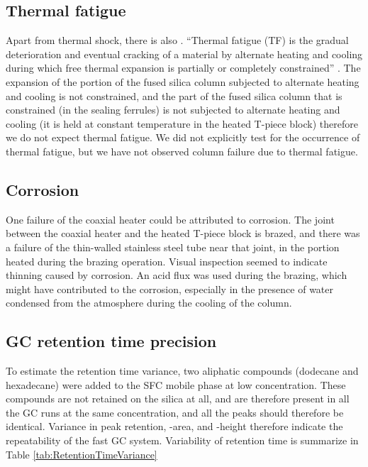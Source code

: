 \subsection{Thermal fatigue}
Apart from thermal shock, there is also . ``Thermal
fatigue (TF) is the gradual deterioration and eventual cracking of a material by
alternate heating and cooling during which free thermal expansion is partially
or completely constrained'' \autocite{Rao2001}. The expansion of the portion of
the fused silica column subjected to alternate heating and cooling is not
constrained, and the part of the fused silica column that is constrained (in the
sealing ferrules) is not subjected to alternate heating and cooling (it is held
at constant temperature in the heated T-piece block) therefore we do not expect
thermal fatigue. We did not explicitly test for the occurrence of thermal
fatigue, but we have not observed column failure due to thermal fatigue.

\subsection{Corrosion}
One failure of the coaxial heater could be attributed to corrosion. The joint
between the coaxial heater and the heated T-piece block is brazed, and there was
a failure of the thin-walled stainless steel tube near that joint, in the
portion heated during the brazing operation. Visual inspection seemed to
indicate thinning caused by corrosion. An acid flux was used during the brazing,
which might have contributed to the corrosion, especially in the presence of
water condensed from the atmosphere during the cooling of the column.

\subsection{GC retention time precision}

To estimate the retention time variance, two aliphatic compounds (dodecane and
hexadecane) were added to the SFC mobile phase at low concentration. These
compounds are not retained on the silica at all, and are therefore present in
all the GC runs at the same concentration, and all the peaks should therefore be
identical. Variance in peak retention, -area, and -height therefore indicate the
repeatability of the fast GC system. Variability of retention time is summarize
in Table \ref{tab:RetentionTimeVariance}

